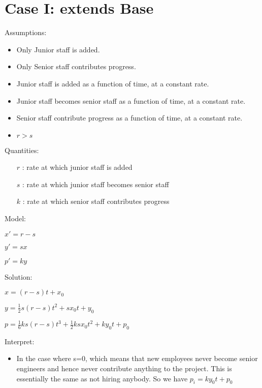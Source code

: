 \documentclass{article}
\newenvironment{atomize}
    {\begin{list} {} {
            \setlength\itemindent{0pt}
            \setlength\leftmargin{10pt}
            \setlength\labelwidth{0pt}
    }}
    {\end{list}}
\begin{document}
\section*{Case I: extends Base}
    \begin{atomize}
        \item Assumptions:
            \begin{itemize}
                \item Only Junior staff is added.
                \item Only Senior staff contributes progress.
								\item Junior staff is added as a function of time, at a constant
								rate.
								\item Junior staff becomes senior staff as a function of time,
								at a constant rate.
								\item Senior staff contribute progress as a function of time, at
								a constant rate.
                \item $r > s$
            \end{itemize}
        \item Quantities:
            \begin{itemize}
                \item [$r$]: rate at which junior staff is added
                \item [$s$]: rate at which junior staff becomes senior staff
                \item [$k$]: rate at which senior staff contributes progress
            \end{itemize}
        \item Model:
            \begin{atomize}
                \item $x\prime = r - s$
                \item $y\prime = sx$
                \item $p\prime = ky$
            \end{atomize}
        \item Solution:
            \begin{atomize}
                \item $x = \left(r - s\right)t + x_{0}$
                \item $y = \frac{1}{2}s\left(r - s\right)t^{2} + sx_{0}t+y_{0}$
								\item $p = \frac{1}{6}ks(r-s)t^{3} + \frac{1}{2}ksx_{0}t^{2} +
								ky_{0}t + p_{0}$
            \end{atomize}
        \item Interpret:
            \begin{itemize}
                \item In the case where s=0, which means that new employees never become senior engineers and hence never contribute anything to the project. This is essentially the same as not hiring anybody. So we have $p_{i}=ky_{0}t + p_{0}$


\end{itemize}
\end{atomize}
\end{document}
